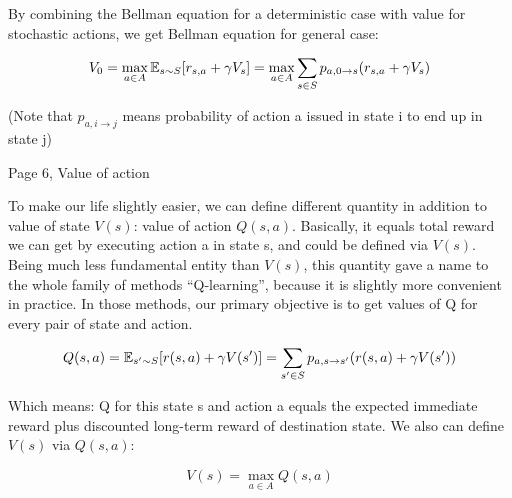 By combining the Bellman
equation for a deterministic case with value for stochastic actions, we get
Bellman equation for general case:

\begin{equation*}
V_0 = \max_{a \in A}\operatorname{\mathbb{E}}_{s \sim S}[r_{s,a} + \gamma V_s] = \max_{a \in A} \sum_{s \in S}
p_{a,0 \rightarrow s}(r_{s,a} + \gamma V_s)
\end{equation*}

(Note that \begin{math}p_{a,i \rightarrow j}\end{math} means probability of action a issued in
state i to end up in state j)



Page 6, Value of action

To make our life slightly easier, we can define different quantity in addition
to value of state \begin{math}V(s)\end{math}: value of action \begin{math}Q(s,a)\end{math}. Basically, it equals total
reward we can get by executing action a in state s, and could be defined via
\begin{math}V(s)\end{math}. Being much less fundamental entity than \begin{math}V(s)\end{math}, this quantity gave a name to
the whole family of methods “Q-learning”, because it is slightly more convenient
in practice. In those methods, our primary objective is to get values of Q for
every pair of state and action.

\begin{equation*}
  Q(s,a) = \operatorname{\mathbb{E}}_{s' \sim S}[r(s,a) + \gamma V(s')] =
  \sum_{s' \in S} p_{a,s \rightarrow s'}(r(s,a) + \gamma V(s'))
\end{equation*}

Which means: Q for this state s and action a equals the expected immediate
reward plus discounted long-term reward of destination state. We also can define
\begin{math}V(s)\end{math} via \begin{math}Q(s, a)\end{math}:

\begin{equation*}
  V(s) = \max_{a \in A} Q(s,a)
\end{equation*}

